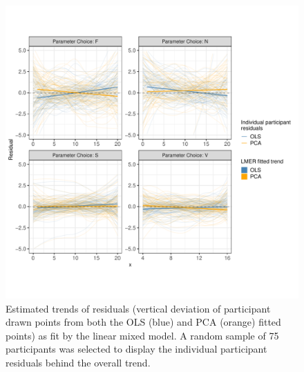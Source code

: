 \documentclass[print]{nuthesis}
\begin{document}
\begin{figure}[tbp]

{\centering \includegraphics[width=1\linewidth,]{thesis_files/figure-latex/eyefitting-lmer-residualplots-1} 

}

\caption[Eye Fitting Straight Lines in the Modern Era LMM results]{Estimated trends of residuals (vertical deviation of participant drawn points from both the OLS (blue) and PCA (orange) fitted points) as fit by the linear mixed model. A random sample of 75 participants was selected to display the individual participant residuals behind the overall trend.}\label{fig:eyefitting-lmer-residualplots}
\end{figure}
\end{document}
